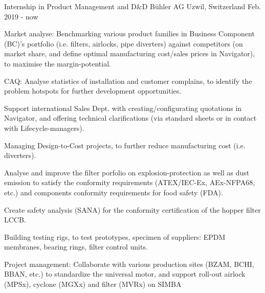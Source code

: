 

\begin{cventries}
	
\cventry
{Internship in Product Management and D\&D} %
{Bühler AG} %
{Uzwil, Switzerland} %
{Feb. 2019 - now} %
{
  \begin{cvitems} %
    \item {Market analyse: Benchmarking various product families in Business Component (BC)'s portfolio (i.e. filters, airlocks, pipe diverters) against competitors (on market share, and define optimal manufacturing cost/sales prices in Navigator), to maximise the margin-potential.}
    \item {CAQ: Analyse statistics of installation and customer complains, to identify the problem hotspots for further development opportunities.}
    \item {Support international Sales Dept. with creating/configurating quotations in Navigator, and offering technical clarifications (via standard sheets or in contact with Lifecycle-managers).}
    \item {Managing Design-to-Cost projects, to further reduce manufacturing cost (i.e. diverters).}
    \item {Analyse and improve the filter porfolio on explosion-protection as well as dust emission to satisfy the conformity requirements (ATEX/IEC-Ex, AEx-NFPA68, etc.) and components conformity requirements for food safety (FDA).}
    \item {Create safety analysis (SANA) for the conformity certification of the hopper filter LCCB.}
    \item {Building testing rigs, to test prototypes, specimen of suppliers: EPDM membranes, bearing rings, filter control units.}
    \item {Project management: Collaborate with various production sites (BZAM, BCHI, BBAN, etc.) to standardize the universal motor, and support roll-out airlock (MPSx), cyclone (MGXx) and filter (MVRx) on SIMBA}
  \end{cvitems}
}


\end{cventries}
